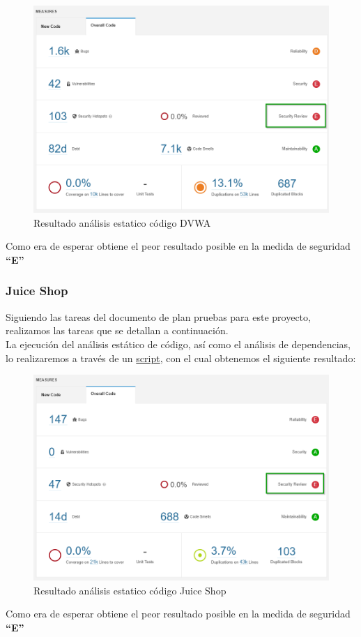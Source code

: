 \begin{figure}[h!]  
    \includegraphics[width=\linewidth]{./imagenes/07_AnalisisEstatico__DVWA.png}
    \caption{Resultado análisis estatico código DVWA}  
    \label{fig:22}
\end{figure}
Como era de esperar obtiene el peor resultado posible en la medida de seguridad \textbf{“E”}
\newpage
\subsubsection{Juice Shop}
Siguiendo las tareas del documento de plan pruebas para este proyecto, realizamos las tareas que se detallan a continuación.\\

La ejecución del análisis estático de código, así como el análisis de dependencias, lo realizaremos a través de un 
\href{https://github.com/M0l1n3ta/PFG/blob/master/Scripts/STAT/RunSonarScaner_JuiceShop.ps1}{script}, con el cual obtenemos 
el siguiente resultado:\\

\begin{figure}[h!]
    \centering  
    \includegraphics[width=\linewidth]{./imagenes/08_AnalisisEstatico_JuiceShop.png}
    \caption{Resultado análisis estatico código Juice Shop}  
    \label{fig:23}
\end{figure}
Como era de esperar obtiene el peor resultado posible en la medida de seguridad \textbf{“E”}
\newpage
